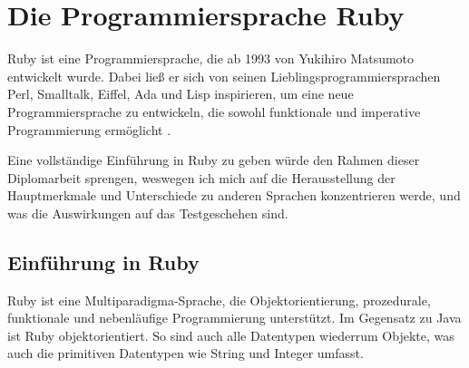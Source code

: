 \section{Die Programmiersprache Ruby}

Ruby ist eine Programmiersprache, die ab 1993 von Yukihiro Matsumoto entwickelt wurde. Dabei ließ er sich von seinen Lieblingsprogrammiersprachen Perl, Smalltalk, Eiffel, Ada und Lisp inspirieren, um eine neue Programmiersprache zu entwickeln, die sowohl funktionale und imperative Programmierung ermöglicht \citep{ruby_visual_identity_team_about_2011}. 

Eine vollständige Einführung in Ruby zu geben würde den Rahmen dieser Diplomarbeit sprengen, weswegen ich mich auf die Herausstellung der Hauptmerkmale und Unterschiede zu anderen Sprachen konzentrieren werde, und was die Auswirkungen auf das Testgeschehen sind.


\subsection{Einführung in Ruby}
Ruby ist eine Multiparadigma-Sprache, die Objektorientierung, prozedurale, funktionale und nebenläufige Programmierung unterstützt. Im Gegensatz zu Java ist Ruby objektorientiert. So sind auch alle Datentypen wiederrum Objekte, was auch die primitiven Datentypen wie String und Integer umfasst. 

